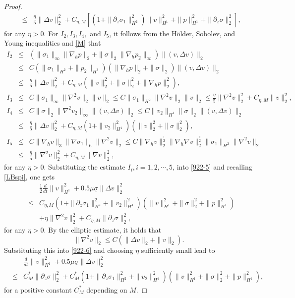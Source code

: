 \documentclass[12pt,reqno]{amsart}
\numberwithin{equation}{section}
\begin{document}
\begin{proof}
\begin{eqnarray*}
    &\leq&\frac\eta5\|\Delta v\|_2^2+C_{\eta,M}[(1+\|\partial_z\sigma_1\|_{H^2}^2)\|v\|_{H^1}^2+\|p\|_{H^1}^2+\|\partial_z\sigma\|_2^2],
  \end{eqnarray*}
  for any $\eta>0$. For $I_2, I_3, I_4,$ and $I_5$, it follows from the H\"older, Sobolev, and Young inequalities and \eqref{M} that
  \begin{eqnarray*}
    I_2&\leq&(\|\sigma_1\|_\infty\|\nabla_hp\|_2+\|\sigma\|_2\|\nabla_hp_2\|_\infty)\|(v,\Delta v)\|_2\\
    &\leq&C(\|\sigma_1\|_{H^2}+\|p_2\|_{H^3})(\|\nabla_hp\|_2+\|\sigma\|_2)\|(v,\Delta v)\|_2\\
    &\leq&\frac\eta5\|\Delta v\|_2^2+C_{\eta,M}(\|v\|_2^2+\|\sigma\|_2^2+\|\nabla_hp\|_2^2),\\
    I_3&\leq&C\|\sigma_1\|_\infty\|\nabla^2v\|_2\|v\|_2\leq C\|\sigma_1\|_{H^2}\|\nabla^2v\|_2\|v\|_2
     \leq \frac\eta5\|\nabla^2v\|_2^2+C_{\eta,M}\|v\|_2^2,\\
    I_4&\leq& C\|\sigma\|_2\|\nabla^2v_2\|_\infty\|(v,\Delta v)\|_2
    \leq C\|v_2\|_{H^4}\|\sigma\|_2\|(v,\Delta v)\|_2\\
    &\leq&\frac\eta5\|\Delta v\|_2^2+C_{\eta,M}(1+\|v_2\|_{H^4}^2)(\|v\|_2^2+\|\sigma\|_2^2),\\
    I_5&\leq&C\|\nabla_hv\|_3\|\nabla\sigma_1\|_6\|\nabla^2v\|_2\leq C\|\nabla_hv\|_2^\frac12\|\nabla_h\nabla v\|_2^\frac12\|\sigma_1\|_{H^2}\|\nabla^2v\|_2\\
    &\leq&\frac\eta5\|\nabla^2v\|_2^2+C_{\eta,M}\|\nabla v\|_2^2,
  \end{eqnarray*}
  for any $\eta>0$. Substituting the estimate $I_i, i=1,2,\cdots,5$, into \eqref{922-5} and recalling \eqref{LBspi}, one gets
  \begin{eqnarray}
    &&\frac12\frac{d}{dt}\|v\|_{H^1}^2+0.5\mu\underline\sigma\|\Delta v\|_2^2\nonumber\\
    &\leq& C_{\eta,M}(1+\|\partial_z\sigma_1\|_{H^2}^2+\|v_2\|_{H^4}^2)(\|v\|_{H^1}^2+\|\sigma\|_2^2+\|p\|_{H^1}^2)\nonumber\\
    &&+\eta\|\nabla^2v\|_2^2+C_{\eta,M}\|\partial_z\sigma\|_2^2,\label{922-6}
  \end{eqnarray}
  for any $\eta>0$. By the elliptic estimate, it holds that
  $$
  \|\nabla^2v\|_2\leq C(\|\Delta v\|_2+\|v\|_2).
  $$
  Substituting this into \eqref{922-6} and choosing $\eta$ sufficiently small lead to
  \begin{eqnarray}
    && \frac{d}{dt}\|v\|_{H^1}^2+0.5\mu\underline\sigma\|\Delta v\|_2^2\nonumber\\
    &\leq& C_M^*\|\partial_z\sigma\|_2^2+
    C_{M}^*(1+\|\partial_z\sigma_1\|_{H^2}^2+\|v_2\|_{H^4}^2)(\|v\|_{H^1}^2+\|\sigma\|_2^2+\|p\|_{H^1}^2),\label{922-7}
  \end{eqnarray}
  for a positive constant $C_M^*$ depending on $M$.


\end{proof}
\end{document}

